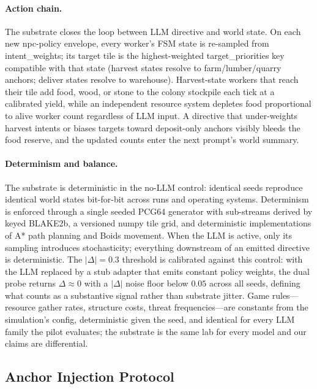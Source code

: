 \paragraph{Action chain.}
The substrate closes the loop between LLM directive and world
state. On each new npc-policy envelope, every worker's FSM state
is re-sampled from \textsf{intent\_weights}; its target tile is
the highest-weighted \textsf{target\_priorities} key compatible
with that state (harvest states resolve to farm/lumber/quarry
anchors; deliver states resolve to warehouse). Harvest-state
workers that reach their tile add food, wood, or stone to the
colony stockpile each tick at a calibrated yield, while an
independent resource system depletes food proportional to alive
worker count regardless of LLM input. A directive that
under-weights harvest intents or biases targets toward
deposit-only anchors visibly bleeds the food reserve, and the
updated counts enter the next prompt's world summary.

\paragraph{Determinism and balance.}
The substrate is deterministic in the no-LLM control: identical
seeds reproduce identical world states bit-for-bit across runs and
operating systems. Determinism is enforced through a single seeded
PCG64 generator with sub-streams derived by keyed BLAKE2b, a
versioned numpy tile grid, and deterministic implementations of
A* path planning and Boids movement. When the LLM is active, only
its sampling introduces stochasticity; everything downstream of an
emitted directive is deterministic. The $|\Delta| = 0.3$ threshold
is calibrated against this control: with the LLM replaced by a
stub adapter that emits constant policy weights, the dual probe
returns $\Delta \approx 0$ with a $|\Delta|$ noise floor below
$0.05$ across all seeds, defining what counts as a substantive
signal rather than substrate jitter. Game rules---resource gather
rates, structure costs, threat frequencies---are constants from
the simulation's config, deterministic given the seed, and
identical for every LLM family the pilot evaluates; the substrate
is the same lab for every model and our claims are differential.

\subsection{Anchor Injection Protocol}
\label{sec:method:anchors}

